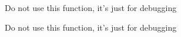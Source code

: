 
\begin{DoxyRefList}
\item[\label{deprecated__deprecated000001}%
\hypertarget{deprecated__deprecated000001}{}%
Member \hyperlink{colors_8h_a5d74c4e071aab5b976217ab7d0fa68dc}{Display\+Grid\+With\+Line\+And\+Column\+Numbers} (const C\+Mat \&Mat)]Do not use this function, it's just for debugging



Do not use this function, it's just for debugging


\end{DoxyRefList}